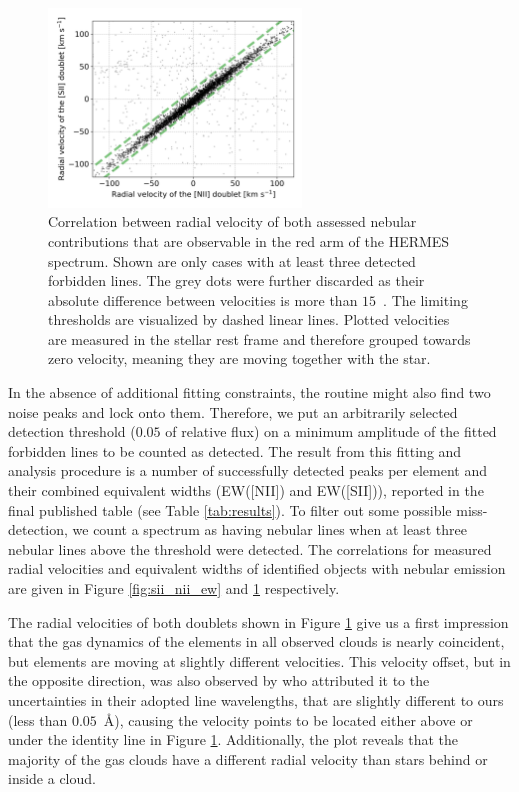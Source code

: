 \begin{figure}
	\centering
	\includegraphics[width=0.6\textwidth]{sii_nii_rv.png}
	\caption{Correlation between radial velocity of both assessed nebular contributions that are observable in the red arm of the HERMES spectrum. Shown are only cases with at least three detected forbidden lines. The grey dots were further discarded as their absolute difference between velocities is more than $15$~\kms. The limiting thresholds are visualized by dashed linear lines. Plotted velocities are measured in the stellar rest frame and therefore grouped towards zero velocity, meaning they are moving together with the star.}
	\label{fig:sii_nii_rv}
\end{figure}

In the absence of additional fitting constraints, the routine might also find two noise peaks and lock onto them. Therefore, we put an arbitrarily selected detection threshold ($0.05$ of relative flux) on a minimum amplitude of the fitted forbidden lines to be counted as detected. The result from this fitting and analysis procedure is a number of successfully detected peaks per element and their combined equivalent widths (EW([NII]) and EW([SII])), reported in the final published table (see Table \ref{tab:results}). To filter out some possible miss-detection, we count a spectrum as having nebular lines when at least three nebular lines above the threshold were detected. The correlations for measured radial velocities and equivalent widths of identified objects with nebular emission are given in Figure \ref{fig:sii_nii_ew} and \ref{fig:sii_nii_rv} respectively.

The radial velocities of both doublets shown in Figure \ref{fig:sii_nii_rv} give us a first impression that the gas dynamics of the elements in all observed clouds is nearly coincident, but elements are moving at slightly different velocities. This velocity offset, but in the opposite direction, was also observed by \citet{2016A&A...591A..74D, 2017A&A...604A.135D} who attributed it to the uncertainties in their adopted line wavelengths, that are slightly different to ours (less than $0.05$~\AA), causing the velocity points to be located either above or under the identity line in Figure \ref{fig:sii_nii_rv}. Additionally, the plot reveals that the majority of the gas clouds have a different radial velocity than stars behind or inside a cloud.

